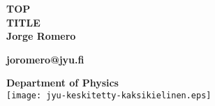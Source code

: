 \begin{titlepage}
	
    \begin{center}
        
        \Large{\textbf{TOP}}\\
        \vspace{0.15\textheight}
        \Huge{\textbf{TITLE}}\\
        \vspace{0.05\textheight}
      \Large{\textbf{Jorge Romero}}
      
      \large{\textbf{{joromero@jyu.fi}}}
    
 \vfill
        \large{\textbf{Department of Physics}}\\
   \vspace{1em}
    \texttt{[image: jyu-keskitetty-kaksikielinen.eps]}
    \end{center}
\end{titlepage}